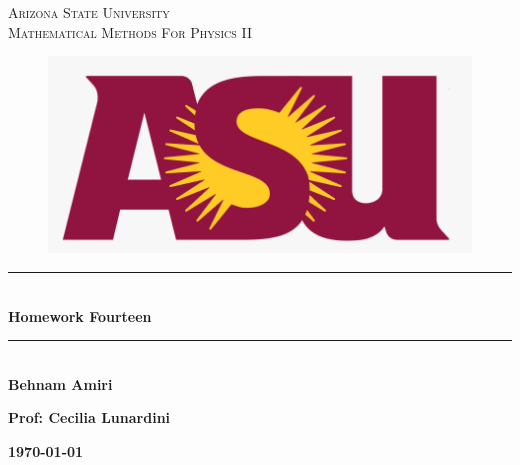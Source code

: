 \documentclass[fleqn]{article}
\begin{document}
  \begin{titlepage}

    \newcommand{\HRule}{\rule{\linewidth}{0.5mm}} 

    \center


    \textsc{\LARGE Arizona State University}\\[1.5cm]

    \textsc{\LARGE Mathematical Methods For Physics II }\\[1.5cm] 


    \begin{figure}
      \includegraphics[width=\linewidth]{asu.png}
    \end{figure}


    \HRule \\[0.4cm]
    { \huge \bfseries Homework Fourteen}\\[0.4cm] 
    \HRule \\[1.5cm]

    \textbf{Behnam Amiri}

    \bigbreak

    \textbf{Prof: Cecilia Lunardini}

    \bigbreak


    \textbf{{\large \today}\\[2cm]}

    \vfill

  \end{titlepage}
\end{document}
